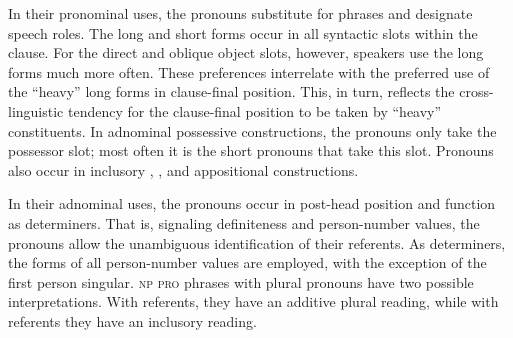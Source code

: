 In their pronominal uses, the pronouns substitute for  phrases and designate speech roles. The long and short  forms occur in all syntactic slots within the clause. For the direct and oblique object slots, however, speakers use the long forms much more often. These preferences interrelate with the preferred use of the ``heavy'' long  forms in clause-final position. This, in turn, reflects the cross-linguistic tendency for the clause-final position to be taken by ``heavy'' constituents. In adnominal possessive constructions, the pronouns only take the possessor slot; most often it is the short pronouns that take this slot. Pronouns also occur in inclusory , , and appositional constructions.



In their adnominal uses, the pronouns occur in post-head position and function as determiners. That is, signaling definiteness and person-number values, the pronouns allow the unambiguous identification of their referents. As determiners, the  forms of all person-number values are employed, with the exception of the first person singular. \textsc{np} \textsc{pro}  phrases with plural pronouns have two possible interpretations. With  referents, they have an additive plural reading, while with  referents they have an  inclusory reading.

